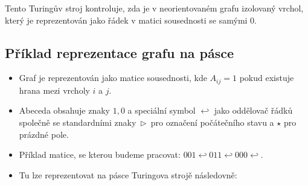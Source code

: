\documentclass[10pt, a4paper]{ReportSheet}
\begin{document}
    \newpage

    Tento Turingův stroj kontroluje, zda je v neorientovaném grafu izolovaný vrchol, který je reprezentován jako řádek v matici sousednosti se samými $0$.

    \subsection*{Příklad reprezentace grafu na pásce}
    \begin{itemize}
        \item Graf je reprezentován jako matice sousednosti, kde $A_{ij} = 1$ pokud existuje hrana mezi vrcholy $i$ a $j$.
        \item Abeceda obsahuje znaky $1, 0$ a speciální symbol $\hookleftarrow$ jako oddělovač řádků společně se standardními
        znaky~$\triangleright$~pro označení počátečního stavu a $\star$ pro prázdné pole.
        \item Příklad matice, se kterou budeme pracovat: $001 \hookleftarrow 011 \hookleftarrow 000 \hookleftarrow$.
        \item Tu lze reprezentovat na pásce Turingova strojě následovně:
    \end{itemize}
\end{document}
